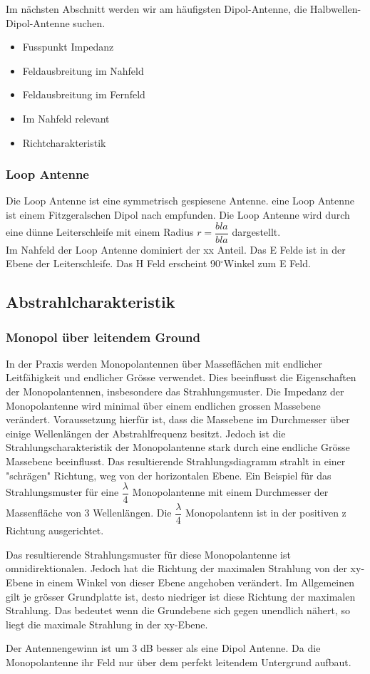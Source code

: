 Im nächsten Abschnitt werden wir am häufigsten Dipol-Antenne, die Halbwellen-Dipol-Antenne suchen.
\begin{itemize}
\item Fusspunkt Impedanz
\item Feldausbreitung im Nahfeld
\item Feldausbreitung im Fernfeld
\item Im Nahfeld relevant
\item Richtcharakteristik
\end{itemize}
\subsubsection{Loop Antenne}
Die Loop Antenne ist eine symmetrisch gespiesene Antenne. eine Loop Antenne ist einem Fitzgeralschen Dipol nach empfunden. Die Loop Antenne wird durch eine dünne Leiterschleife mit einem Radius  $r=\dfrac{bla}{bla}$  dargestellt. \\
Im Nahfeld der Loop Antenne dominiert der xx Anteil. Das E Felde ist in der Ebene der Leiterschleife. Das H Feld erscheint 90$^\circ$Winkel zum E Feld. 
\subsection{Abstrahlcharakteristik}
\subsubsection{Monopol über leitendem Ground}
In der Praxis werden Monopolantennen über Masseflächen mit endlicher Leitfähigkeit und endlicher Grösse verwendet. Dies beeinflusst die Eigenschaften der Monopolantennen, insbesondere das  Strahlungsmuster. Die Impedanz der Monopolantenne wird minimal über einem endlichen grossen Massebene verändert. Voraussetzung hierfür ist, dass die Massebene  im Durchmesser über einige  Wellenlängen der Abstrahlfrequenz besitzt. Jedoch ist die Strahlungscharakteristik der Monopolantenne stark durch eine endliche Grösse Massebene beeinflusst. Das resultierende
 Strahlungsdiagramm strahlt in einer "schrägen" Richtung, weg von
  der horizontalen Ebene. Ein Beispiel für das Strahlungsmuster für eine 
  $\dfrac{\lambda}{4}$ 
  Monopolantenne mit einem Durchmesser der Massenfläche von 3 Wellenlängen. 
  Die  $\dfrac{\lambda}{4}$  Monopolantenn ist in der positiven z Richtung ausgerichtet.


Das resultierende Strahlungsmuster für diese Monopolantenne ist  omnidirektionalen. Jedoch hat die Richtung der maximalen Strahlung von der xy-Ebene in einem Winkel von dieser Ebene angehoben verändert. Im Allgemeinen gilt je  grösser Grundplatte ist, desto niedriger ist diese Richtung der maximalen Strahlung. Das bedeutet wenn die Grundebene sich gegen  unendlich nähert, so liegt die maximale  Strahlung  in der xy-Ebene.

Der Antennengewinn ist  um 3 dB besser als eine Dipol Antenne. Da die Monopolantenne ihr Feld nur über dem perfekt leitendem Untergrund aufbaut.
\cite{sti06}
\cite{sti06}
